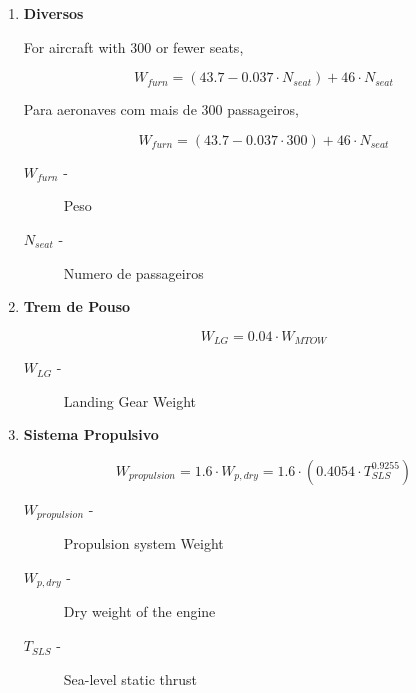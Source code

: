 \begin{enumerate}
\vspace{0.5cm}

\item \textbf{Diversos}

For aircraft with 300 or fewer seats,

\begin{equation}
W_{furn} = (43.7 - 0.037 \cdot N_{seat} ) + 46 \cdot N_{seat}
\end{equation}

Para aeronaves com mais de 300 passageiros,

\begin{equation}
W_{furn} = (43.7 - 0.037 \cdot 300 ) + 46 \cdot N_{seat}
\end{equation}

\begin{description}
\item [$W_{furn}$ -] Peso
\item [$N_{seat}$ -] Numero de passageiros
\end{description}

\vspace{0.5cm}

\item \textbf{Trem de Pouso}

\begin{equation}
W_{LG} =  0.04 \cdot W_{MTOW}
\end{equation}

\begin{description}
\item [$W_{LG}$ -] Landing Gear Weight
\end{description}

\vspace{0.5cm}

\item \textbf{Sistema Propulsivo}

\begin{equation}
W_{propulsion} = 1.6 \cdot W_{p,dry} = 1.6 \cdot (0.4054 \cdot T_{SLS}^{0.9255})
\end{equation}

\begin{description}
\item [$W_{propulsion}$ -] Propulsion system Weight
\item [$W_{p,dry}$ -] Dry weight of the engine
\item [$T_{SLS}$ -] Sea-level static thrust
\end{description}

\end{enumerate}




